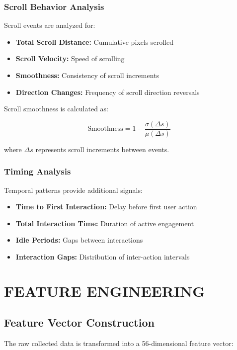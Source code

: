 \subsubsection{Scroll Behavior Analysis}

Scroll events are analyzed for:
\begin{itemize}
    \item \textbf{Total Scroll Distance:} Cumulative pixels scrolled
    \item \textbf{Scroll Velocity:} Speed of scrolling
    \item \textbf{Smoothness:} Consistency of scroll increments
    \item \textbf{Direction Changes:} Frequency of scroll direction reversals
\end{itemize}

Scroll smoothness is calculated as:

$$\text{Smoothness} = 1 - \frac{\sigma(\Delta s)}{\mu(\Delta s)}$$

where $\Delta s$ represents scroll increments between events.

\subsubsection{Timing Analysis}

Temporal patterns provide additional signals:
\begin{itemize}
    \item \textbf{Time to First Interaction:} Delay before first user action
    \item \textbf{Total Interaction Time:} Duration of active engagement
    \item \textbf{Idle Periods:} Gaps between interactions
    \item \textbf{Interaction Gaps:} Distribution of inter-action intervals
\end{itemize}

\section{FEATURE ENGINEERING}

\subsection{Feature Vector Construction}

The raw collected data is transformed into a 56-dimensional feature vector:

